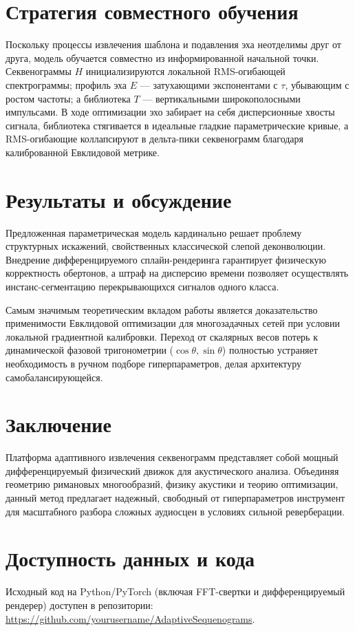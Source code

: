 \documentclass[11pt,a4paper]{article}
\begin{document}
\section{Стратегия совместного обучения}
Поскольку процессы извлечения шаблона и подавления эха неотделимы друг от друга, модель обучается совместно из информированной начальной точки. Секвенограммы $H$ инициализируются локальной RMS-огибающей спектрограммы; профиль эха $E$ — затухающими экспонентами с $\tau$, убывающим с ростом частоты; а библиотека $T$ — вертикальными широкополосными импульсами. В ходе оптимизации эхо забирает на себя дисперсионные хвосты сигнала, библиотека стягивается в идеальные гладкие параметрические кривые, а RMS-огибающие коллапсируют в дельта-пики секвенограмм благодаря калиброванной Евклидовой метрике.

\section{Результаты и обсуждение}
Предложенная параметрическая модель кардинально решает проблему структурных искажений, свойственных классической слепой деконволюции. Внедрение дифференцируемого сплайн-рендеринга гарантирует физическую корректность обертонов, а штраф на дисперсию времени позволяет осуществлять инстанс-сегментацию перекрывающихся сигналов одного класса.

Самым значимым теоретическим вкладом работы является доказательство применимости Евклидовой оптимизации для многозадачных сетей при условии локальной градиентной калибровки. Переход от скалярных весов потерь к динамической фазовой тригонометрии ($\cos\theta, \sin\theta$) полностью устраняет необходимость в ручном подборе гиперпараметров, делая архитектуру самобалансирующейся.

\section{Заключение}
Платформа адаптивного извлечения секвенограмм представляет собой мощный дифференцируемый физический движок для акустического анализа. Объединяя геометрию римановых многообразий, физику акустики и теорию оптимизации, данный метод предлагает надежный, свободный от гиперпараметров инструмент для масштабного разбора сложных аудиосцен в условиях сильной реверберации.

\section*{Доступность данных и кода}
Исходный код на Python/PyTorch (включая FFT-свертки и дифференцируемый рендерер) доступен в репозитории: \url{https://github.com/yourusername/AdaptiveSequenograms}.



\end{document}
